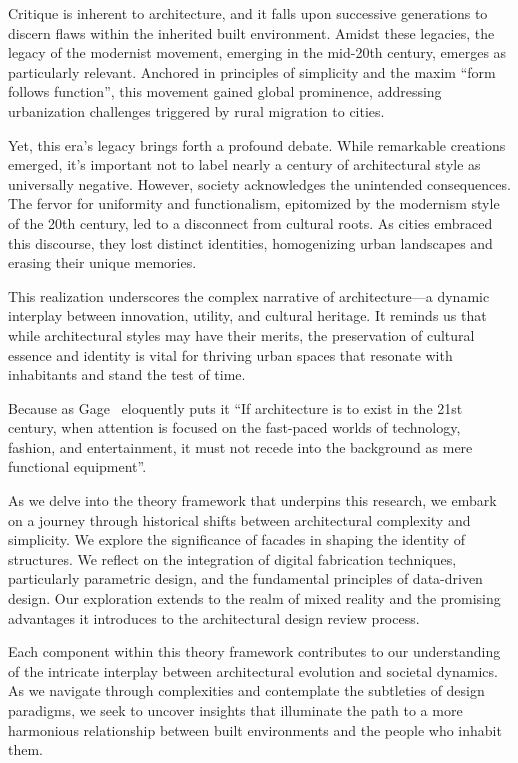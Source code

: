 Critique is inherent to architecture, and it falls upon successive generations to discern flaws within the inherited built environment.
Amidst these legacies, the legacy of the modernist movement, emerging in the mid-20th century, emerges as particularly relevant.
Anchored in principles of simplicity and the maxim ``form follows function'', this movement gained global prominence, addressing urbanization challenges triggered by rural migration to cities.

Yet, this era's legacy brings forth a profound debate.
While remarkable creations emerged, it's important not to label nearly a century of architectural style as universally negative.
However, society acknowledges the unintended consequences.
The fervor for uniformity and functionalism, epitomized by the modernism style of the 20th century, led to a disconnect from cultural roots.
As cities embraced this discourse, they lost distinct identities, homogenizing urban landscapes and erasing their unique memories.

This realization underscores the complex narrative of architecture—a dynamic interplay between innovation, utility, and cultural heritage.
It reminds us that while architectural styles may have their merits, the preservation of cultural essence and identity is vital for thriving urban spaces that resonate with inhabitants and stand the test of time.

 Because as Gage~\cite{Gage2015} eloquently puts it ``If architecture is to exist in the 21st century, when attention is focused on the fast-paced worlds of technology, fashion, and entertainment, it must not recede into the background as mere functional equipment''.

As we delve into the theory framework that underpins this research, we embark on a journey through historical shifts between architectural complexity and simplicity.
We explore the significance of facades in shaping the identity of structures.
We reflect on the integration of digital fabrication techniques, particularly parametric design, and the fundamental principles of data-driven design.
Our exploration extends to the realm of mixed reality and the promising advantages it introduces to the architectural design review process.

Each component within this theory framework contributes to our understanding of the intricate interplay between architectural evolution and societal dynamics.
As we navigate through complexities and contemplate the subtleties of design paradigms, we seek to uncover insights that illuminate the path to a more harmonious relationship between built environments and the people who inhabit them.

